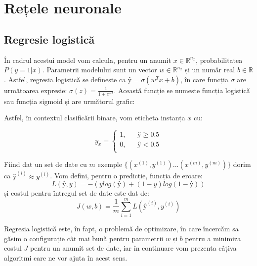 \def \pred {\textit{\^{y}}}

\section{Rețele neuronale}

\subsection{Regresie logistică}
În cadrul acestui model vom calcula, pentru un anumit $x \in \mathbb{R}^{n_x}$, probabilitatea $P(y=1|x)$. Parametrii modelului sunt un vector $w \in \mathbb{R}^{n_x}$ și un număr real $b \in \mathbb{R}$. Astfel, regresia logistică se definește ca $\pred=\sigma(w^Tx + b)$, în care funcția $\sigma$ are următoarea expresie: $\displaystyle{\sigma(z)=\frac{1}{1 + e^{-z}}}$. Această funcție se numeste funcția logistică sau funcția sigmoid și are următorul grafic:

\begin{center}
\end{center}

Astfel, în contextul clasificării binare, vom eticheta instanța $x$ cu:

\[
y_x=
	\begin{cases}
		\text{1,} &\quad \pred \geq 0.5 \\
		\text{0,} &\quad \pred < 0.5 \\
	\end{cases}
\]

Fiind dat un set de date cu $m$ exemple $\{(x^{(1)}, y^{(1)})...(x^{(m)}, y^{(m)})\}$ dorim ca $\pred^{(i)} \approx y^{(i)}$. Vom defini, pentru o predicție, funcția de eroare: $$L(\pred, y)=-(ylog(\pred) + (1-y)log(1 - \pred))$$ și costul pentru întregul set de date este dat de: $$\displaystyle{J(w,b)=\frac{1}{m}\sum\limits_{i=1}^{m}L(\pred^{(i)}, y^{(i)})}$$

Regresia logistică este, în fapt, o problemă de optimizare, în care încercăm sa găsim o configurație cât mai bună pentru parametrii $w$ și $b$ pentru a minimiza costul $J$ pentru un anumit set de date, iar în continuare vom prezenta câțiva algoritmi care ne vor ajuta în acest sens.

